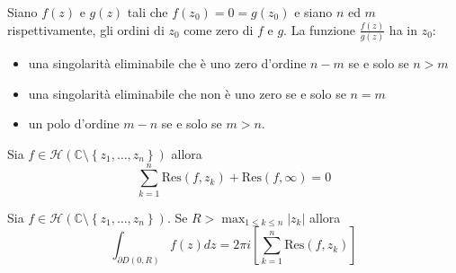 \begin{thm}
Siano $f(z)$ e $g(z)$ tali che $f\left( z_{0}\right) =0=g\left( z_{0}\right)$ e siano $n$ ed $m$ rispettivamente, gli ordini di $z_{0}$ come zero di $f$ e $g$. La funzione $\frac{f(z)}{g(z)}$ ha in $z_{0}$:

\begin{itemize}
\item una singolarità eliminabile che è uno zero d'ordine $n-m$ se e solo se $n >m$
\item una singolarità eliminabile che non è uno zero se e solo se $n=m$
\item un polo d'ordine $m-n$ se e solo se $m >n$.
\end{itemize}
\end{thm}
\begin{thm}
Sia $f\in \mathcal{H}\left(\mathbb{C} \setminus \left\{z_{1} ,\dotsc ,z_{n}\right\}\right)$ allora
\begin{equation*}
\sum\limits ^{n}_{k=1}\mathrm{Res}\left( f,z_{k}\right) +\mathrm{Res}\left( f,\infty \right) =0
\end{equation*}
\end{thm}
\begin{thm}
Sia $f\in \mathcal{H}\left(\mathbb{C} \setminus \left\{z_{1} ,\dotsc ,z_{n}\right\}\right)$. Se $R >\max_{1\leqslant k\leqslant n}\left| z_{k}\right| $ allora
\begin{equation*}
\int\nolimits _{\partial D\left( 0,R\right)} f\left( z\right) dz=2\pi i\left[\sum\limits ^{n}_{k=1}\mathrm{Res}\left( f,z_{k}\right)\right]
\end{equation*}
\end{thm}
